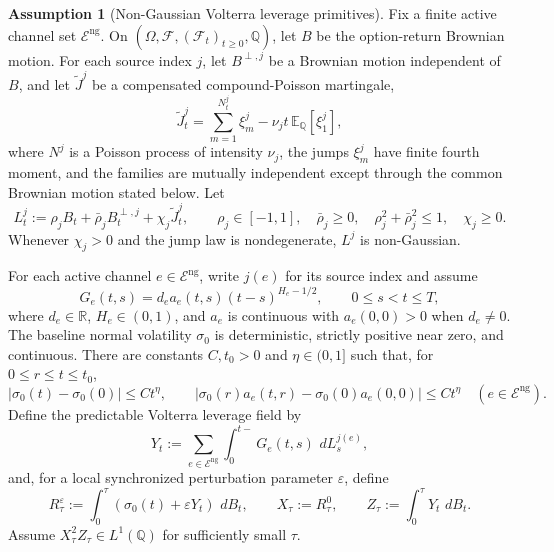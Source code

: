 \documentclass[11pt,a4paper]{amsart}
\theoremstyle{plain}
\theoremstyle{definition}
\newtheorem{assumption}[theorem]{Assumption}
\theoremstyle{remark}
\newcommand{\R}{\mathbb{R}}
\newcommand{\QQ}{\mathbb{Q}}
\newcommand{\EE}{\mathbb{E}}
\newcommand{\cF}{\mathcal{F}}
\newcommand{\cE}{\mathcal{E}}
\newcommand{\dd}{\,d}
\begin{document}
\begin{assumption}[Non-Gaussian Volterra leverage primitives]\label{ass:ng-volterra-primitives}
Fix a finite active channel set \(\cE^{\mathrm{ng}}\).  On
\((\Omega,\cF,(\cF_t)_{t\ge0},\QQ)\), let \(B\) be the option-return Brownian motion.  For each
source index \(j\), let \(B^{\perp,j}\) be a Brownian motion independent of \(B\), and let
\(\widetilde J^j\) be a compensated compound-Poisson martingale,
\[
        \widetilde J_t^j
        =
        \sum_{m=1}^{N_t^j}\xi_m^j
        -\nu_jt\,\EE_\QQ[\xi_1^j],
\]
where \(N^j\) is a Poisson process of intensity \(\nu_j\), the jumps \(\xi_m^j\) have finite
fourth moment, and the families are mutually independent except through the common Brownian motion
stated below.  Let
\[
        L_t^j
        :=
        \rho_j B_t+\bar\rho_j B_t^{\perp,j}+\chi_j\widetilde J_t^j,
        \qquad
        \rho_j\in[-1,1],
        \quad
        \bar\rho_j\ge0,
        \quad
        \rho_j^2+\bar\rho_j^2\le1,
        \quad
        \chi_j\ge0 .
\]
Whenever \(\chi_j>0\) and the jump law is nondegenerate, \(L^j\) is non-Gaussian.

For each active channel \(e\in\cE^{\mathrm{ng}}\), write \(j(e)\) for its source index and assume
\[
        G_e(t,s)
        =
        d_e a_e(t,s)(t-s)^{H_e-1/2},
        \qquad
        0\le s<t\le T,
\]
where \(d_e\in\R\), \(H_e\in(0,1)\), and \(a_e\) is continuous with \(a_e(0,0)>0\) when
\(d_e\ne0\).  The baseline normal volatility \(\sigma_0\) is deterministic, strictly positive near
zero, and continuous.  There are constants \(C,t_0>0\) and \(\eta\in(0,1]\) such that, for
\(0\le r\le t\le t_0\),
\[
        |\sigma_0(t)-\sigma_0(0)|\le Ct^\eta,
        \qquad
        |\sigma_0(r)a_e(t,r)-\sigma_0(0)a_e(0,0)|\le Ct^\eta
        \quad(e\in\cE^{\mathrm{ng}}).
\]
Define the predictable Volterra leverage field by
\[
        Y_t
        :=
        \sum_{e\in\cE^{\mathrm{ng}}}\int_0^{t-}G_e(t,s)\,\dd L_s^{j(e)},
\]
and, for a local synchronized perturbation parameter \(\varepsilon\), define
\[
        R_\tau^\varepsilon
        :=
        \int_0^\tau (\sigma_0(t)+\varepsilon Y_t)\,\dd B_t,
        \qquad
        X_\tau:=R_\tau^0,
        \qquad
        Z_\tau:=\int_0^\tau Y_t\,\dd B_t .
\]
Assume \(X_\tau^2Z_\tau\in L^1(\QQ)\) for sufficiently small \(\tau\).
\end{assumption}
\end{document}
